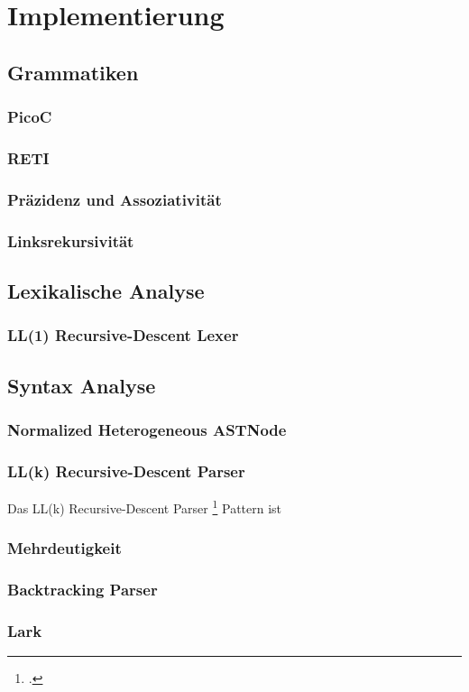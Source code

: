 \chapter{Implementierung}
\section{Grammatiken}
\subsection{PicoC}
\subsection{RETI}
\subsection{Präzidenz und Assoziativität}
\subsection{Linksrekursivität}
\section{Lexikalische Analyse}
\subsection{LL(1) Recursive-Descent Lexer}
\section{Syntax Analyse}
\subsection{Normalized Heterogeneous ASTNode}
\subsection{LL(k) Recursive-Descent Parser}
Das LL(k) Recursive-Descent Parser \footcite{parr_language_2009} Pattern ist
\subsection{Mehrdeutigkeit}
\subsection{Backtracking Parser}
\subsection{Lark}
